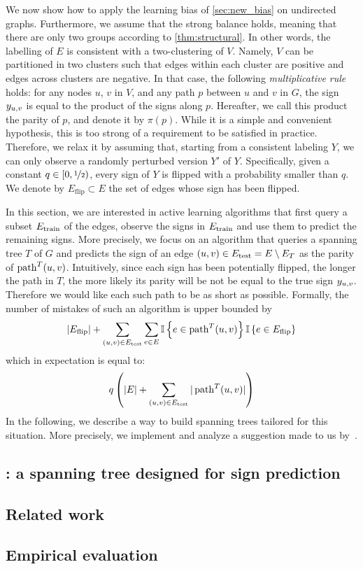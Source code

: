We now show how to apply the learning bias of \autoref{sec:new_bias} on undirected graphs.
Furthermore, we assume that the strong balance holds, meaning that there are only two groups
according to \autoref{thm:structural}. In other words, the labelling of $E$ is consistent with a
two-clustering of $V$. Namely, $V$ can be partitioned in two clusters such that edges within each
cluster are positive and edges across clusters are negative.
In that case, the following
\emph{multiplicative rule} holds: for any nodes $u$, $v$ in $V$, and any path $p$ between $u$ and
$v$ in $G$, the sign $y_{u, v}$ is equal to the product of the signs along $p$. Hereafter, we call this
product the parity of $p$, and denote it by $\pi(p)$.
While it is a simple and convenient hypothesis, this is too strong
of a requirement to be satisfied in practice. Therefore, we relax it by assuming that, starting from
a consistent labeling $Y$, we can only observe a randomly perturbed version $Y'$ of $Y$.
Specifically, given a constant $q\in [0, \nicefrac{1}{2})$, every sign of $Y$ is flipped with a
probability smaller than $q$. We denote by $E_{\mathrm{flip}} \subset E$ the set of edges whose sign
has been flipped.

In this section, we are interested in active learning algorithms that first query a subset
$E_{\mathrm{train}}$ of the edges, observe the signs in $E_{\mathrm{train}}$ and use them to predict the remaining signs.
More precisely, we focus on an algorithm that queries a spanning tree $T$ of $G$ and predicts the
sign of an edge $(u,v) \in E_{\mathrm{test}} = E \setminus E_T$ as the parity of $\operatorname{path}^T(u, v)$. Intuitively, since
each sign has been potentially flipped, the longer the path in $T$, the more likely its parity will
be not be equal to the true sign $y_{u, v}{}$. Therefore we would like each such path to be as short as
possible.
Formally, the number of mistakes of such an algorithm is upper bounded by~\autocite[Equation
(3)]{Cesa-Bianchi2012b}
\begin{equation*}
  |E_{\mathrm{flip}}| + \sum_{(u,v) \in E_{\mathrm{test}}}
  \sum_{e\in E} \mathbb{I}\left\{{e \in \operatorname{path}^T(u, v)}\right\} \mathbb{I}\left\{{e \in E_{\mathrm{flip}}}\right\}
\end{equation*}
which in expectation is equal to:
\begin{equation}
  \label{eq:stretch_mistakes}
  q\left(|E| + \sum_{(u,v) \in E_{\mathrm{test}}} |\operatorname{path}^T(u, v)| \right)
\end{equation}
In the following, we describe a way to build spanning trees tailored for this situation. More
precisely, we implement and analyze a suggestion made to us by~\autocite{gtxFabio}.

\subsection{\gtx{}: a spanning tree designed for sign prediction}
\label{sub:gtx_algo}



\subsection{Related work}
\label{sub:gtx_related_work}



\subsection{Empirical evaluation}
\label{sub:gtx_empirical_evaluation}


